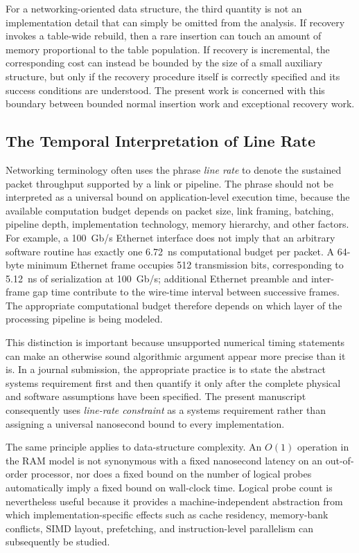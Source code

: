 \documentclass[conference]{IEEEtran}
\begin{document}
For a networking-oriented data structure, the third quantity is not an implementation detail that can simply be omitted from the analysis. If recovery invokes a table-wide rebuild, then a rare insertion can touch an amount of memory proportional to the table population. If recovery is incremental, the corresponding cost can instead be bounded by the size of a small auxiliary structure, but only if the recovery procedure itself is correctly specified and its success conditions are understood. The present work is concerned with this boundary between bounded normal insertion work and exceptional recovery work.

\subsection{The Temporal Interpretation of Line Rate}

Networking terminology often uses the phrase \emph{line rate} to denote the sustained packet throughput supported by a link or pipeline. The phrase should not be interpreted as a universal bound on application-level execution time, because the available computation budget depends on packet size, link framing, batching, pipeline depth, implementation technology, memory hierarchy, and other factors. For example, a 100~Gb/s Ethernet interface does not imply that an arbitrary software routine has exactly one 6.72~ns computational budget per packet. A 64-byte minimum Ethernet frame occupies 512 transmission bits, corresponding to 5.12~ns of serialization at 100~Gb/s; additional Ethernet preamble and inter-frame gap time contribute to the wire-time interval between successive frames. The appropriate computational budget therefore depends on which layer of the processing pipeline is being modeled.

This distinction is important because unsupported numerical timing statements can make an otherwise sound algorithmic argument appear more precise than it is. In a journal submission, the appropriate practice is to state the abstract systems requirement first and then quantify it only after the complete physical and software assumptions have been specified. The present manuscript consequently uses \emph{line-rate constraint} as a systems requirement rather than assigning a universal nanosecond bound to every implementation.

The same principle applies to data-structure complexity. An $O(1)$ operation in the RAM model is not synonymous with a fixed nanosecond latency on an out-of-order processor, nor does a fixed bound on the number of logical probes automatically imply a fixed bound on wall-clock time. Logical probe count is nevertheless useful because it provides a machine-independent abstraction from which implementation-specific effects such as cache residency, memory-bank conflicts, SIMD layout, prefetching, and instruction-level parallelism can subsequently be studied.
\end{document}

